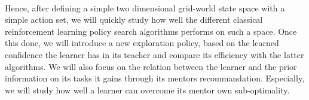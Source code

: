 \documentclass[a4paper]{report}
\begin{document}
{{			\paragraph{} Hence, after defining a simple two dimensional grid-world state space with a simple action set, we will quickly study how well the different classical reinforcement learning policy search algorithms performs on such a space. Once this done, we will introduce a new exploration policy, based on the learned confidence the learner has in its teacher and compare its efficiency with the latter algorithms. We will also focus on the relation between the learner and the prior information on its tasks it gains through its mentors recommandation. Especially, we will study how well a learner can overcome its mentor own sub-optimality. 
		}
	}
	\newpage
	
\end{document}
